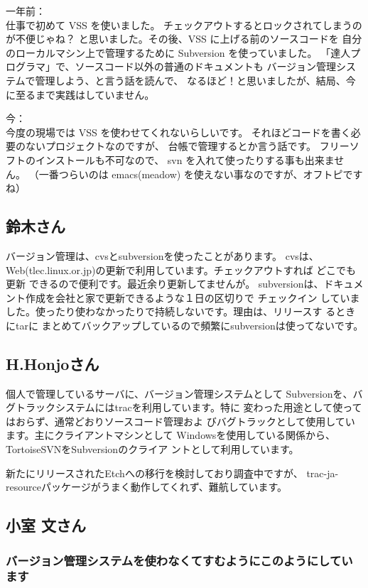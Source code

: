 \documentclass[mingoth,a4paper]{jsarticle}
\begin{document}
一年前：\\
仕事で初めて VSS を使いました。
チェックアウトするとロックされてしまうのが不便じゃね？
と思いました。その後、VSS に上げる前のソースコードを
自分のローカルマシン上で管理するために Subversion を使っていました。
「達人プログラマ」で、ソースコード以外の普通のドキュメントも
バージョン管理システムで管理しよう、と言う話を読んで、
なるほど！と思いましたが、結局、今に至るまで実践はしていません。

今：\\
今度の現場では VSS を使わせてくれないらしいです。
それほどコードを書く必要のないプロジェクトなのですが、
台帳で管理するとか言う話です。
フリーソフトのインストールも不可なので、
svn を入れて使ったりする事も出来ません。
（一番つらいのは emacs(meadow) を使えない事なのですが、オフトピですね）


\subsection{鈴木さん}
バージョン管理は、cvsとsubversionを使ったことがあります。
cvsは、Web(tlec.linux.or.jp)の更新で利用しています。チェックアウトすれば
どこでも更新
できるので便利です。最近余り更新してませんが。
subversionは、ドキュメント作成を会社と家で更新できるような１日の区切りで
チェックイン
していました。使ったり使わなかったりで持続しないです。理由は、リリースす
るときにtarに
まとめてバックアップしているので頻繁にsubversionは使ってないです。


\subsection{H.Honjoさん}
個人で管理しているサーバに、バージョン管理システムとして
Subversionを、バグトラックシステムにはtracを利用しています。特に
変わった用途として使ってはおらず、通常どおりソースコード管理およ
びバグトラックとして使用しています。主にクライアントマシンとして
Windowsを使用している関係から、TortoiseSVNをSubversionのクライア
ントとして利用しています。

新たにリリースされたEtchへの移行を検討しており調査中ですが、
trac-ja-resourceパッケージがうまく動作してくれず、難航しています。

\subsection{小室 文さん}
\subsubsection{バージョン管理システムを使わなくてすむようにこのようにしています}
\end{document}
